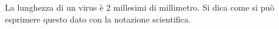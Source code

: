 La lunghezza di un virus è 2 millesimi di millimetro. 
Si dica come si può esprimere questo dato con la notazione 
scientifica.
